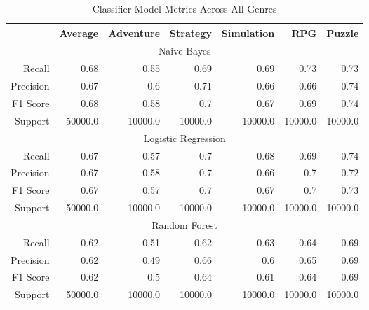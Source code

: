 \begin{table}[h]
    \centering
    \begin{tabular}{r|r|r|r|r|r|r}
        & Average & Adventure & Strategy & Simulation & RPG & Puzzle \\\hline
        \multicolumn{7}{c}{Naive Bayes} \\\hline
        Recall      & 0.68 & 0.55 & 0.69 & 0.69 & 0.73 & 0.73 \\
        Precision   & 0.67 & 0.6 & 0.71 & 0.66 & 0.66 & 0.74 \\
        F1 Score    & 0.68 & 0.58 & 0.7 & 0.67 & 0.69 & 0.74 \\
        Support     & 50000.0 & 10000.0 & 10000.0 & 10000.0 & 10000.0 & 10000.0 \\\hline
        \multicolumn{7}{c}{Logistic Regression} \\\hline
        Recall      & 0.67 & 0.57 & 0.7 & 0.68 & 0.69 & 0.74 \\
        Precision   & 0.67 & 0.58 & 0.7 & 0.66 & 0.7 & 0.72 \\
        F1 Score    & 0.67 & 0.57 & 0.7 & 0.67 & 0.7 & 0.73 \\
        Support     & 50000.0 & 10000.0 & 10000.0 & 10000.0 & 10000.0 & 10000.0 \\\hline
        \multicolumn{7}{c}{Random Forest} \\\hline
        Recall      & 0.62 & 0.51 & 0.62 & 0.63 & 0.64 & 0.69 \\
        Precision   & 0.62 & 0.49 & 0.66 & 0.6 & 0.65 & 0.69 \\
        F1 Score    & 0.62 & 0.5 & 0.64 & 0.61 & 0.64 & 0.69 \\
        Support     & 50000.0 & 10000.0 & 10000.0 & 10000.0 & 10000.0 & 10000.0 \\\hline
    \end{tabular}
    \caption{Classifier Model Metrics Across All Genres}
    \label{tab:combined_model_metrics}
\end{table}